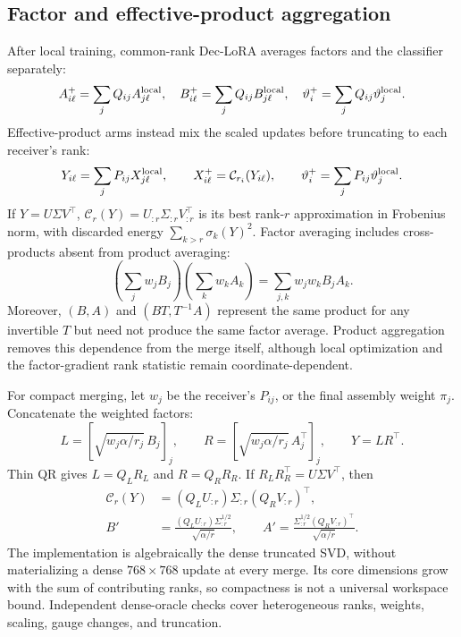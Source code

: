 \documentclass[11pt]{article}
\begin{document}
\subsection{Factor and effective-product aggregation}
After local training, common-rank Dec-LoRA averages factors and the classifier separately:
\begin{equation}
 A_{i\ell}^{+}=\sum_jQ_{ij}A_{j\ell}^{\rm local},\quad
 B_{i\ell}^{+}=\sum_jQ_{ij}B_{j\ell}^{\rm local},\quad
 \vartheta_i^{+}=\sum_jQ_{ij}\vartheta_j^{\rm local}.
 \label{eq:factor}
\end{equation}
Effective-product arms instead mix the scaled updates before truncating to each receiver's rank:
\begin{equation}
 Y_{i\ell}=\sum_jP_{ij}X_{j\ell}^{\rm local},\qquad
 X_{i\ell}^{+}=\mathcal C_{r_i}(Y_{i\ell}),\qquad
 \vartheta_i^{+}=\sum_jP_{ij}\vartheta_j^{\rm local}.
 \label{eq:product}
\end{equation}
If $Y=U\Sigma V^\top$, $\mathcal C_r(Y)=U_{:r}\Sigma_{:r}V_{:r}^\top$ is its best rank-$r$ approximation in Frobenius norm, with discarded energy $\sum_{k>r}\sigma_k(Y)^2$. Factor averaging includes cross-products absent from product averaging:
\begin{equation}
 \left(\sum_jw_jB_j\right)\left(\sum_kw_kA_k\right)
 =\sum_{j,k}w_jw_kB_jA_k.
\end{equation}
Moreover, $(B,A)$ and $(BT,T^{-1}A)$ represent the same product for any invertible $T$ but need not produce the same factor average. Product aggregation removes this dependence from the merge itself, although local optimization and the factor-gradient rank statistic remain coordinate-dependent.

For compact merging, let $w_j$ be the receiver's $P_{ij}$, or the final assembly weight $\pi_j$. Concatenate the weighted factors:
\begin{equation}
 L=[\sqrt{w_j\alpha/r_j}\,B_j]_j,\qquad
 R=[\sqrt{w_j\alpha/r_j}\,A_j^\top]_j,\qquad Y=LR^\top.
\end{equation}
Thin QR gives $L=Q_LR_L$ and $R=Q_RR_R$. If $R_LR_R^\top=U\Sigma V^\top$, then
\begin{align}
 \mathcal C_r(Y)&=(Q_LU_{:r})\Sigma_{:r}(Q_RV_{:r})^\top,\\
 B'&=\frac{(Q_LU_{:r})\Sigma_{:r}^{1/2}}{\sqrt{\alpha/r}},\qquad
 A'=\frac{\Sigma_{:r}^{1/2}(Q_RV_{:r})^\top}{\sqrt{\alpha/r}}.
 \label{eq:compact}
\end{align}
The implementation is algebraically the dense truncated SVD, without materializing a dense $768\times768$ update at every merge. Its core dimensions grow with the sum of contributing ranks, so compactness is not a universal workspace bound. Independent dense-oracle checks cover heterogeneous ranks, weights, scaling, gauge changes, and truncation.
\end{document}
